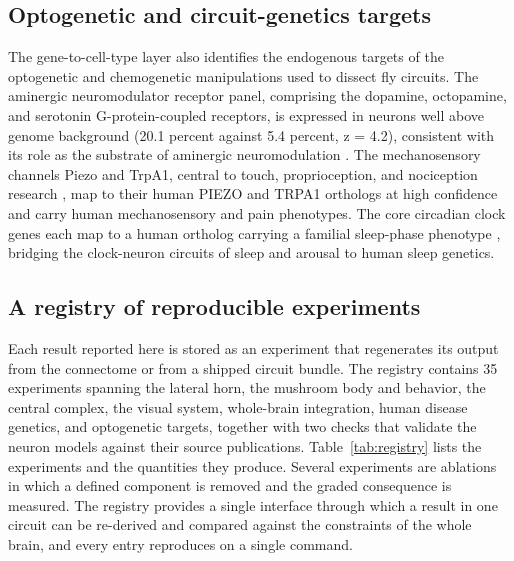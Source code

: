 \documentclass[9pt,twocolumn,twoside]{article}
\begin{document}
\subsection{Optogenetic and circuit-genetics targets}
The gene-to-cell-type layer also identifies the endogenous targets of the optogenetic and
chemogenetic manipulations used to dissect fly circuits. The aminergic neuromodulator receptor panel,
comprising the dopamine, octopamine, and serotonin G-protein-coupled receptors, is expressed in
neurons well above genome background (20.1 percent against 5.4 percent, z = 4.2), consistent with its
role as the substrate of aminergic neuromodulation \cite{nadim2014}. The mechanosensory channels
Piezo and TrpA1, central to touch, proprioception, and nociception research \cite{coste2010}, map to
their human PIEZO and TRPA1 orthologs at high confidence and carry human mechanosensory and pain
phenotypes. The core circadian clock genes each map to a human ortholog carrying a familial
sleep-phase phenotype \cite{guo2016}, bridging the clock-neuron circuits of sleep and arousal to human
sleep genetics.

\subsection{A registry of reproducible experiments}
Each result reported here is stored as an experiment that regenerates its output from the connectome
or from a shipped circuit bundle. The registry contains 35 experiments spanning the lateral horn, the
mushroom body and behavior, the central complex, the visual system, whole-brain integration, human
disease genetics, and optogenetic targets, together with two checks that validate the neuron models
against their source publications. Table~\ref{tab:registry} lists the experiments and the quantities
they produce. Several experiments are ablations in which a defined component is removed and the graded
consequence is measured. The registry provides a single interface through which a result in one
circuit can be re-derived and compared against the constraints of the whole brain, and every entry
reproduces on a single command.
\end{document}
